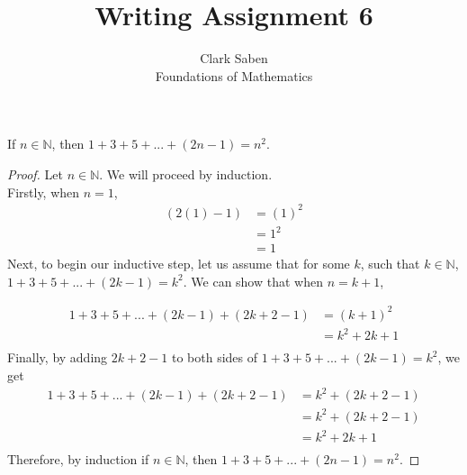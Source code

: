\documentclass[12pt]{article}
\newenvironment{theorem}[2][Theorem]{\begin{trivlist}
\item[\hskip \labelsep {\bfseries #1}\hskip \labelsep {\bfseries #2.}]}{\end{trivlist}}
\begin{document}
 
 
\title{Writing Assignment 6}%
\author{Clark Saben\\ %
Foundations of Mathematics} %
 
\maketitle

 
\begin{theorem}{WA 6.1}
	If $n \in \mathbb{N}$, then $1+3+5+...+(2n-1) = n^2$. 
\end{theorem}
\begin{proof}
Let $n \in \mathbb{N}$. We will proceed by induction.\\
Firstly, when $n=1$,
\begin{align*}
	(2(1)-1) &= (1)^2\\
		 &= 1^2\\
		 &= 1
\end{align*}
Next, to begin our inductive step, let us assume that for some $k$, such that $k \in \mathbb{N}$, $1+3+5+...+(2k-1) = k^2$. We can
show that when $n=k+1$,

\begin{align*}
	1+3+5+...+(2k-1) + (2k+2-1) &= (k+1)^2\\
				    &= k^2 + 2k + 1\\
\end{align*}
Finally, by adding $2k+2-1$ to both sides of $1+3+5+...+(2k-1) = k^2$, we get
\begin{align*}
	{1+3+5+...+(2k-1) + (2k+2-1)} &= k^2 + (2k+2-1)\\
				      &= k^2 + (2k+2-1)\\
				      &= k^2 + 2k + 1\\
\end{align*}
Therefore, by induction if $n \in \mathbb{N}$, then $1+3+5+...+(2n-1) = n^2$.
\end{proof}
 
\pagebreak
\end{document}
